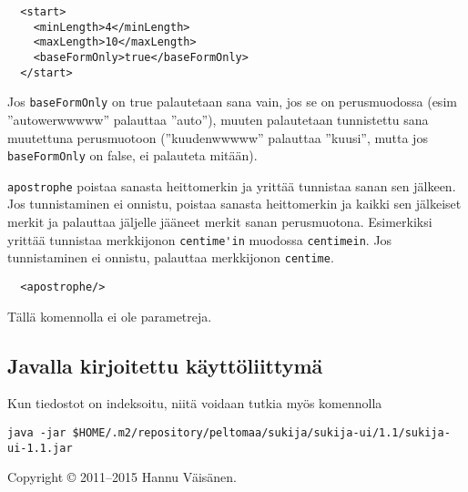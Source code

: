 \documentclass[12pt]{article}
\begin{document}
\begin{verbatim}
  <start>
    <minLength>4</minLength>
    <maxLength>10</maxLength>
    <baseFormOnly>true</baseFormOnly>
  </start>
\end{verbatim}

Jos \verb=baseFormOnly= on true palautetaan sana vain, jos se on
perusmuodossa (esim ''autowerwwwww'' palauttaa ''auto''), muuten
palautetaan tunnistettu sana muutettuna perusmuotoon (''kuudenwwwww''
palauttaa ''kuusi'', mutta jos \verb=baseFormOnly= on false, ei
palauteta mitään).




\bigskip

\verb=apostrophe= poistaa sanasta heittomerkin ja yrittää tunnistaa
sanan sen jälkeen. Jos tunnistaminen ei onnistu, poistaa sanasta
heittomerkin ja kaikki sen jälkeiset merkit ja palauttaa jäljelle
jääneet merkit sanan perusmuotona. Esimerkiksi yrittää tunnistaa
merkkijonon \verb=centime'in= muodossa \verb=centimein=. Jos
tunnistaminen ei onnistu, palauttaa merkkijonon \verb=centime=.


\begin{verbatim}
  <apostrophe/>
\end{verbatim}

Tällä komennolla ei ole parametreja.


\subsection*{Javalla kirjoitettu käyttöliittymä}

Kun tiedostot on indeksoitu, niitä voidaan tutkia myös komennolla

{\scriptsize
\verb|java -jar $HOME/.m2/repository/peltomaa/sukija/sukija-ui/1.1/sukija-ui-1.1.jar|
}

\bigskip \noindent \noindent
Copyright © 2011--2015 Hannu Väisänen.
\end{document}
